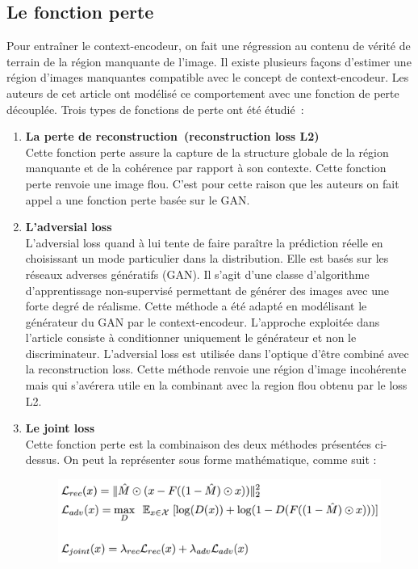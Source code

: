 \documentclass[11pt,a4paper]{article}
\begin{document}
        \subsection{Le fonction perte}
            Pour entraîner le context-encodeur, on fait une régression au contenu de vérité de terrain de la région manquante de l’image.  Il existe plusieurs façons d’estimer une région d’images manquantes compatible avec le concept de context-encodeur. Les auteurs de cet article ont modélisé ce comportement avec une fonction de perte découplée.  Trois types de fonctions de perte ont été étudié :
            \begin{enumerate}[noitemsep]
                \item \textbf{La perte de reconstruction (reconstruction loss L2)}\\
                Cette fonction perte assure la capture de la structure globale de la région manquante et de la cohérence par rapport à son contexte. Cette fonction perte renvoie une image flou. C'est pour cette raison que les auteurs on fait appel a une fonction perte basée sur le GAN.
                \item \textbf{L’adversial loss}\\
                L’adversial loss quand à lui tente de faire paraître la prédiction réelle en choisissant un mode particulier dans la distribution. Elle est basés sur les réseaux adverses génératifs (GAN). Il s’agit d’une classe d’algorithme d’apprentissage non-supervisé permettant de générer des images avec une forte degré de réalisme. Cette méthode a été adapté en modélisant le générateur du GAN par le context-encodeur. L’approche exploitée dans l’article consiste à conditionner uniquement le générateur et non le discriminateur. L'adversial loss est utilisée dans l'optique d'être combiné avec la reconstruction loss. Cette méthode renvoie une région d'image incohérente mais qui s'avérera utile en la combinant avec la region flou obtenu par le loss L2.
                \item \textbf{Le joint loss}\\
                Cette fonction perte est la combinaison des deux méthodes présentées ci-dessus. On peut la représenter sous forme mathématique, comme suit :
                \begin{figure}[H]
                    \centering
                    \includegraphics[scale=0.34]{formule.png} 

\end{figure}
\end{enumerate}
\end{document}

